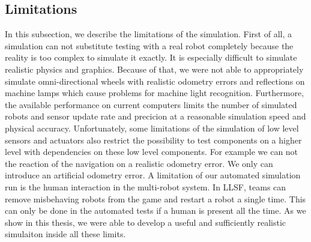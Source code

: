 \subsection{Limitations}
In this subsection, we describe the limitations of the simulation. First of all, a simulation can not substitute testing with a real robot completely because the reality is too complex to simulate it exactly. It is especially difficult to simulate realistic physics and graphics. Because of that, we were not able to appropriately simulate omni-directional wheels with realistic odometry errors and reflections on machine lamps which cause problems for machine light recognition. Furthermore, the available performance on current computers limits the number of simulated robots and sensor update rate and precicion at a reasonable simulation speed and physical accuracy. Unfortunately, some limitations of the simulation of low level sensors and actuators also restrict the possibility to test components on a higher level with dependencies on these low level components. For example we can not the reaction of the navigation on a realistic odometry error. We only can introduce an artificial odometry error. A limitation of our automated simulation run is the human interaction in the multi-robot system. In LLSF, teams can remove misbehaving robots from the game and restart a robot a single time. This can only be done in the automated tests if a human is present all the time. As we show in this thesis, we were able to develop a useful and sufficiently realistic simulaiton inside all these limits.\\

